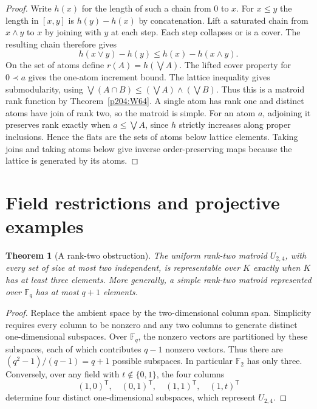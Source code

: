 \documentclass[11pt,oneside,openany]{book}
\theoremstyle{plain}
\newtheorem{theorem}{Theorem}[chapter]
\theoremstyle{definition}
\theoremstyle{remark}
\begin{document}
\begin{proof}
Write \(h(x)\) for the length of such a chain from \(0\)
to \(x\). For \(x\le y\) the length in \([x,y]\) is
\(h(y)-h(x)\) by concatenation. Lift a saturated chain from
\(x\wedge y\) to \(x\) by joining with \(y\) at each step.
Each step collapses or is a cover. The resulting chain
therefore gives
\[
 h(x\vee y)-h(y)\le h(x)-h(x\wedge y).
\]
On the set of atoms define \(r(A)=h(\bigvee A)\). The lifted
cover property for \(0\prec a\) gives the one-atom increment
bound. The lattice inequality gives submodularity, using
\(\bigvee(A\cap B)\le(\bigvee A)\wedge(\bigvee B)\).
Thus this is a matroid rank function by
Theorem~\ref{p204:W64}. A single atom has rank one and
distinct atoms have join of rank two, so the matroid is
simple. For an atom \(a\), adjoining it preserves rank
exactly when \(a\le\bigvee A\), since \(h\) strictly
increases along proper inclusions. Hence the flats are the
sets of atoms below lattice elements. Taking joins and
taking atoms below give inverse order-preserving maps
because the lattice is generated by its atoms.
\end{proof}

\section{Field restrictions and projective examples}

\begin{theorem}[A rank-two obstruction]
\label{p204:W73}
The uniform rank-two matroid \(U_{2,4}\), with every set of
size at most two independent, is representable over \(K\)
exactly when \(K\) has at least three elements. More generally,
a simple rank-two matroid represented over \(\mathbb F_q\)
has at most \(q+1\) elements.
\end{theorem}

\begin{proof}
Replace the ambient space by the two-dimensional column span.
Simplicity requires every column to be nonzero and any two
columns to generate distinct one-dimensional subspaces.
Over \(\mathbb F_q\), the nonzero vectors are partitioned by
these subspaces, each of which contributes \(q-1\) nonzero
vectors. Thus there are
\((q^2-1)/(q-1)=q+1\) possible subspaces. In particular
\(\mathbb F_2\) has only three. Conversely, over any field
with \(t\notin\{0,1\}\), the four columns
\[
 (1,0)^{\mathsf T},\quad(0,1)^{\mathsf T},\quad
 (1,1)^{\mathsf T},\quad(1,t)^{\mathsf T}
\]
determine four distinct one-dimensional subspaces, which
represent \(U_{2,4}\).
\end{proof}
\end{document}
